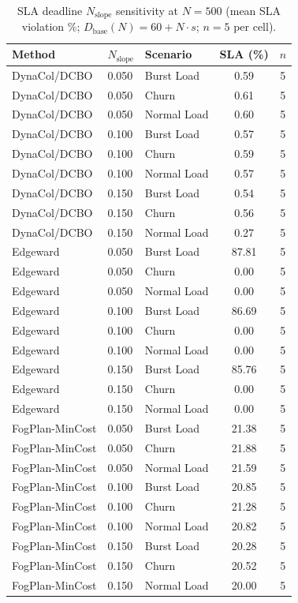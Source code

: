 \begin{table}[!t]
\centering
\caption{SLA deadline $N_\mathrm{slope}$ sensitivity at $N=500$ (mean SLA violation \%; $D_{\mathrm{base}}(N)=60+N\cdot s$; $n=5$ per cell).}
\label{tab:sla_slope}
\fgcsTableCol
\begin{tabular*}{\columnwidth}{@{\extracolsep{\fill}}@{}lllcc@{}@{}}
\toprule
\textbf{Method} & \textbf{$N_\mathrm{slope}$} & \textbf{Scenario} & \textbf{SLA (\%)} & \textbf{$n$} \\
\midrule
DynaCol/DCBO & 0.050 & Burst Load & 0.59 & 5 \\
DynaCol/DCBO & 0.050 & Churn & 0.61 & 5 \\
DynaCol/DCBO & 0.050 & Normal Load & 0.60 & 5 \\
DynaCol/DCBO & 0.100 & Burst Load & 0.57 & 5 \\
DynaCol/DCBO & 0.100 & Churn & 0.59 & 5 \\
DynaCol/DCBO & 0.100 & Normal Load & 0.57 & 5 \\
DynaCol/DCBO & 0.150 & Burst Load & 0.54 & 5 \\
DynaCol/DCBO & 0.150 & Churn & 0.56 & 5 \\
DynaCol/DCBO & 0.150 & Normal Load & 0.27 & 5 \\
Edgeward & 0.050 & Burst Load & 87.81 & 5 \\
Edgeward & 0.050 & Churn & 0.00 & 5 \\
Edgeward & 0.050 & Normal Load & 0.00 & 5 \\
Edgeward & 0.100 & Burst Load & 86.69 & 5 \\
Edgeward & 0.100 & Churn & 0.00 & 5 \\
Edgeward & 0.100 & Normal Load & 0.00 & 5 \\
Edgeward & 0.150 & Burst Load & 85.76 & 5 \\
Edgeward & 0.150 & Churn & 0.00 & 5 \\
Edgeward & 0.150 & Normal Load & 0.00 & 5 \\
FogPlan-MinCost & 0.050 & Burst Load & 21.38 & 5 \\
FogPlan-MinCost & 0.050 & Churn & 21.88 & 5 \\
FogPlan-MinCost & 0.050 & Normal Load & 21.59 & 5 \\
FogPlan-MinCost & 0.100 & Burst Load & 20.85 & 5 \\
FogPlan-MinCost & 0.100 & Churn & 21.28 & 5 \\
FogPlan-MinCost & 0.100 & Normal Load & 20.82 & 5 \\
FogPlan-MinCost & 0.150 & Burst Load & 20.28 & 5 \\
FogPlan-MinCost & 0.150 & Churn & 20.52 & 5 \\
FogPlan-MinCost & 0.150 & Normal Load & 20.00 & 5 \\
\bottomrule
\end{tabular*}
\end{table}